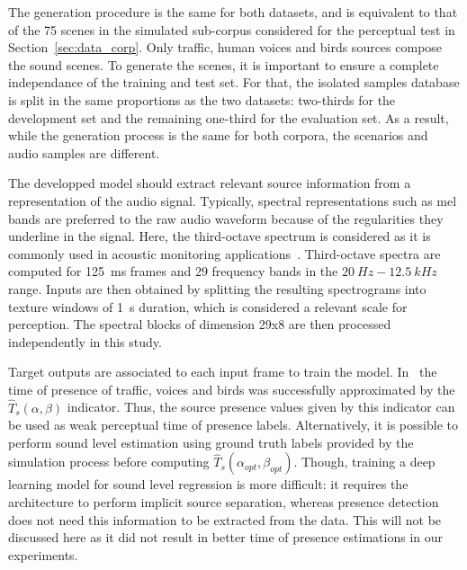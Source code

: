 \documentclass[11pt,a4paper]{article}
\begin{document}
The generation procedure is the same for both datasets, and is equivalent to that of the 75 scenes in the simulated sub-corpus considered for the perceptual test in Section~\ref{sec:data_corp}. Only traffic, human voices and birds sources compose the sound scenes. To generate the scenes, it is important to ensure a complete independance of the training and test set. For that, the isolated samples database is split in the same proportions as the two datasets: two-thirds for the development set and the remaining one-third for the evaluation set. As a result, while the generation process is the same for both corpora, the scenarios and audio samples are different.

The developped model should extract relevant source information from a representation of the audio signal. Typically, spectral representations such as mel bands are preferred to the raw audio waveform because of the regularities they underline in the signal. Here, the third-octave spectrum is considered as it is commonly used in acoustic monitoring applications~\cite{ardouin2018, gontier2017}. Third-octave spectra are computed for 125~ms frames and 29 frequency bands in the $20~Hz - 12.5~kHz$ range. Inputs are then obtained by splitting the resulting spectrograms into texture windows of 1~s duration, which is considered a relevant scale for perception. The spectral blocks of dimension 29x8 are then processed independently in this study.

Target outputs are associated to each input frame to train the model. In~\cite{gontier2018} the time of presence of traffic, voices and birds was successfully approximated by the $\hat T_s(\alpha, \beta)$ indicator. Thus, the source presence values given by this indicator can be used as weak perceptual time of presence labels. Alternatively, it is possible to perform sound level estimation using ground truth labels provided by the simulation process before computing $\hat T_s(\alpha_{opt}, \beta_{opt})$. Though, training a deep learning model for sound level regression is more difficult: it requires the architecture to perform implicit source separation, whereas presence detection does not need this information to be extracted from the data. This will not be discussed here as it did not result in better time of presence estimations in our experiments.
\end{document}
